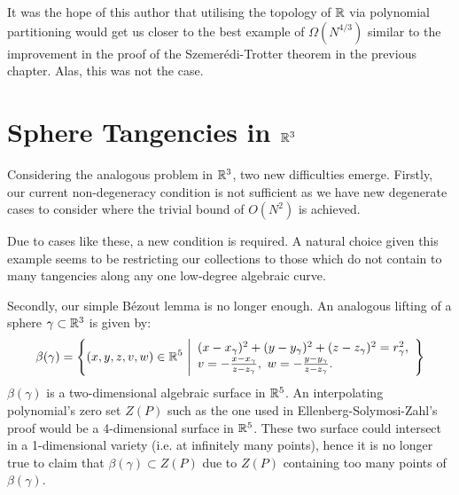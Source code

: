\begin{remark}
It was the hope of this author that utilising the topology of $\mathbb R$ via polynomial partitioning would get us closer to the best example of $\Omega(N^{4/3})$ 
similar to the improvement in the proof of the Szemerédi-Trotter theorem in the previous chapter. Alas, this was not the case.
\end{remark}

\section{Sphere Tangencies in $\mathbb R^{3}$}
Considering the analogous problem in $\mathbb R^{3}$, two new difficulties emerge. 
Firstly, our current non-degeneracy condition is not sufficient as we have new degenerate cases to consider where the trivial bound of $O(N^2)$ is achieved. 
\begin{example}
\end{example}
Due to cases like these, a new condition is required. A natural choice given this example seems to be restricting our collections to those which do not contain to many tangencies along any one low-degree algebraic curve. 

Secondly, our simple Bézout lemma is no longer enough. An analogous lifting of a sphere $\gamma \subset \mathbb R^3$ is given by:
\[
    \beta(\gamma) = \left\{ (x,y,z,v,w) \in \mathbb R^5\ \middle\vert \begin{array}{l}
        (x-x_\gamma)^2 + (y-y_\gamma)^2 + (z-z_\gamma)^2 = r_\gamma^2,\\
        v = - \frac{x-x_\gamma}{z-z_\gamma}, \ w = - \frac{y-y_\gamma}{z-z_\gamma}.
  \end{array}\right\}
\]
$\beta(\gamma)$ is a two-dimensional algebraic surface in $\mathbb R^5$. An interpolating polynomial's zero set $Z(P)$ such as the one used in Ellenberg-Solymosi-Zahl's proof would be a 4-dimensional surface in $\mathbb R^5$.
These two surface could intersect in a 1-dimensional variety (i.e. at infinitely many points), hence it is no longer true to claim that $\beta(\gamma) \subset Z(P)$ due to $Z(P)$ containing too many points of $\beta(\gamma)$.

